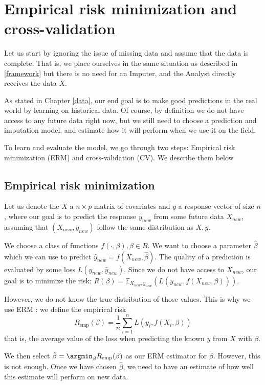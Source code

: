 	\section{Empirical risk minimization and cross-validation}
	\label{ERM}
Let us start by ignoring the issue of missing data and assume that the data is complete. That is, we place ourselves in the same situation as described in \ref{framework} but there is no need for an Imputer, and the Analyst directly receives the data $X$.
	
As stated in Chapter \ref{data}, our end goal is to make good predictions in the real world by learning on historical data. Of course, by definition we do not have access to any future data right now, but we still need to choose a prediction and imputation model, and estimate how it will perform when we use it on the field. 

To learn and evaluate the model, we go through two steps: Empirical risk minimization (ERM) and cross-validation (CV). We describe them below
		\subsection{Empirical risk minimization}
Let us denote the $X$ a $n \times p$ matrix of covariates and $y$ a response vector of size $n$, where our goal is to predict the response $y_{new}$ from some future data $X_{new}$, assuming that $(X_{new}, y_{new})$ follow the same distribution as $X,y$. 

We choose a class of functions $f(\cdot, \beta), \beta \in B$. We want to choose a parameter $\hat{\beta}$ which we can use to predict $\hat{y}_{new} = f(X_{new}, \hat{\beta})$. The quality of a prediction is evaluated by some loss $L(y_{new},\hat{y}_{new})$. Since we do not have access to $X_{new}$, our goal is to minimize the risk: $R(\beta) = \mathbb{E}_{X_{new},y_{new}}(L(y_{new}, f(X_{new}, \beta)))$.

However, we do not know the true distribution of those values. This is why we use ERM \cite{ERM}: we define the empirical risk
$$ R_{\text{emp}}(\beta) = \frac{1}{n} \sum\limits_{i=1}^n L(y_i, f(X_i, \beta))$$
that is, the average value of the loss when predicting the known $y$ from $X$ with $\beta$.

We then select $\hat{\beta} = \argmin_{\beta} R_{\text{emp}}(\beta)$ as our ERM estimator for $\beta$. However, this is not enough. Once we have chosen $\hat{\beta}$, we need to have an estimate of how well this estimate will perform on new data.

